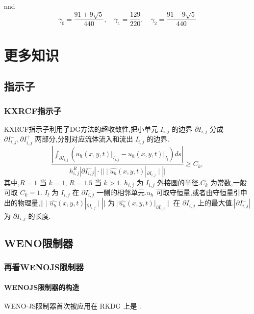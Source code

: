 \documentclass{book}
\begin{document}
and
\begin{equation}
  \gamma_{0}=\frac{91+9 \sqrt{5}}{440}, \quad \gamma_{1}=\frac{129}{220}, \quad \gamma_{2}=\frac{91-9 \sqrt{5}}{440}
\end{equation}



\chapter{更多知识}
\section{指示子}
\subsection{KXRCF指示子}
KXRCF指示子利用了DG方法的超收敛性\cite{RN92},把小单元 $I_{i,j}$ 的边界 $\partial I_{i,j}$ 分成 $\partial I_{i,j}^-,\partial I_{i,j}^+$ 两部分,分别对应流体流入和流出 $I_{i,j}$ 的边界.
\begin{equation}
  \frac{\left|\int_{\partial I_{i, j}^{-}}\left(\left.u_{h}(x, y, t)\right|_{I_{i, j}}-\left.u_{h}(x, y, t)\right|_{I_{l}}\right) d s\right|}{h_{i, j}^{R}\left|\partial I_{i, j}^{-}\right| \cdot||\mid \widehat{u_{h}}(x, y, t)|_{\partial I_{i, j}}\mid||} \geq C_{k},
\end{equation}
其中,$R=1$ 当 $k=1$, $R=1.5$ 当 $k>1$. $h_{i,j}$ 为 $I_{i,j}$ 外接圆的半径.$C_k$ 为常数,一般可取 $C_k = 1$. $I_l$ 为 $I_{i,j}$ 在 $\partial I_{i,j}^-$ 一侧的相邻单元.$u_h$ 可取守恒量,或者由守恒量引申出的物理量,$||\mid \widehat{u_{h}}(x, y, t)|_{\partial I_{i, j}}\mid||$ 为 $\mid \widehat{u_{h}}(x, y, t)|_{\partial I_{i, j}}\mid$ 在 $\partial I_{i,j}$ 上的最大值.$|\partial I_{i,j}^-|$ 为 $\partial I_{i,j}^-$ 的长度.
\section{WENO限制器}

\subsection{再看WENOJS限制器}

\subsubsection{WENOJS限制器的构造}
WENO-JS限制器首次被应用在 RKDG 上是 \cite{RKDG+WENOJS-1,RKDG+WENOJS-2}.
\end{document}
